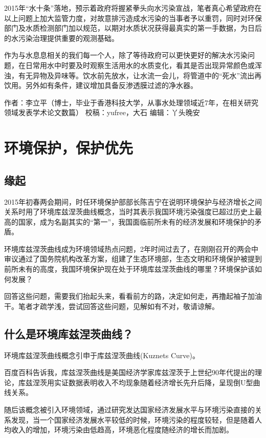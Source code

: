 \documentclass[]{book}
\begin{document}
2015年``水十条''落地，预示着政府将握紧拳头向水污染宣战，笔者真心希望政府在以上问题上加大监管力度，对故意排污造成水污染的当事者予以重罚，同时对环保部门及水质检测部门加以规范，以期对水质状况获得最真实的第一手数据，为日后的水污染治理提供重要的观测基础。

作为与水息息相关的我们每一个人，除了等待政府可以更快更好的解决水污染问题，在日常用水中时要及时观察生活用水的水质变化，看其是否出现异常颜色或浑浊，有无异物及异味等。饮水前先放水，让水流一会儿，将管道中的``死水''流出再饮用。另外如有条件，建议增加具备反渗透膜过滤的净水器。

作者：李立平（博士，毕业于香港科技大学，从事水处理领域近7年，在相关研究领域发表学术论文数篇）
校稿：yufree，大石 编辑：丫头晚安

\section{环境保护，保护优先}

\subsection{缘起}

2015年初春两会期间，时任环境保护部部长陈吉宁在说明环境保护与经济增长之间关系时用了环境库兹涅茨曲线概念，当时其表示我国环境污染强度已超过历史上最高的国家，成为名副其实的``第一''，我国面临前所未有的经济发展和环境保护的矛盾。

环境库兹涅茨曲线成为环境领域热点问题，2年时间过去了，在刚刚召开的两会中审议通过了国务院机构改革方案，组建了生态环境部，生态文明和环境保护被提到前所未有的高度，我国环境保护现在处于环境库兹涅茨曲线的哪里？环境保护该如何发展？

回答这些问题，需要我们抬起头来，看看前方的路，决定如何走，再撸起袖子加油干。笔者才疏学浅，尝试回答这些问题，见解如有不对，敬请谅解。

\subsection{什么是环境库兹涅茨曲线？}

环境库兹涅茨曲线概念引申于库兹涅茨曲线(Kuznets Curve)。

百度百科告诉我，库兹涅茨曲线是美国经济学家库兹涅茨于上世纪90年代提出的理论，库兹涅茨用实证数据表明收入不均现象随着经济增长先升后降，呈现倒U型曲线关系。

随后该概念被引入环境领域，通过研究发达国家经济发展水平与环境污染直接的关系发现，当一个国家经济发展水平较低的时候，环境污染的程度较轻，但是随着人均收入的增加，环境污染由低趋高，环境恶化程度随经济的增长而加剧。
\end{document}

